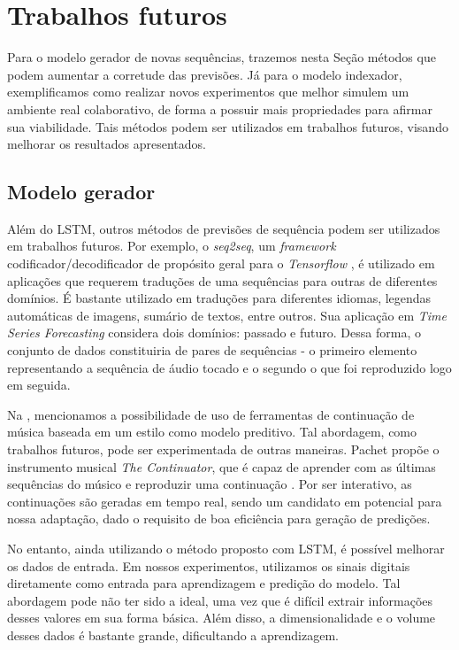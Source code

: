 \section{Trabalhos futuros}
\label{sec:later_work}

Para o modelo gerador de novas sequências, trazemos nesta Seção métodos que podem aumentar a corretude das previsões. Já para o modelo indexador, exemplificamos como realizar novos experimentos que melhor simulem um ambiente real colaborativo, de forma a possuir mais propriedades para afirmar sua viabilidade. Tais métodos podem ser utilizados em trabalhos futuros, visando melhorar os resultados apresentados.

\subsection{Modelo gerador}

Além do LSTM, outros métodos de previsões de sequência podem ser utilizados em trabalhos futuros. Por exemplo, o \textit{seq2seq}, um \textit{framework} codificador/decodificador de propósito geral para o \textit{Tensorflow} \cite{seq2seq}, é utilizado em aplicações que requerem traduções de uma sequências para outras de diferentes domínios. É bastante utilizado em traduções para diferentes idiomas, legendas automáticas de imagens, sumário de textos, entre outros. Sua aplicação em \textit{Time Series Forecasting} considera dois domínios: passado e futuro. Dessa forma, o conjunto de dados constituiria de pares de sequências - o primeiro elemento representando a sequência de áudio tocado e o segundo o que foi reproduzido logo em seguida.

Na , mencionamos a possibilidade de uso de ferramentas de continuação de música baseada em um estilo como modelo preditivo. Tal abordagem, como trabalhos futuros, pode ser experimentada de outras maneiras. Pachet propõe o instrumento musical \textit{The Continuator}, que é capaz de aprender com as últimas sequências do músico e reproduzir uma continuação \cite{continuator}. Por ser interativo, as continuações são geradas em tempo real, sendo um candidato em potencial para nossa adaptação, dado o requisito de boa eficiência para geração de predições.

No entanto, ainda utilizando o método proposto com LSTM, é possível melhorar os dados de entrada. Em nossos experimentos, utilizamos os sinais digitais diretamente como entrada para aprendizagem e predição do modelo. Tal abordagem pode não ter sido a ideal, uma vez que é difícil extrair informações desses valores em sua forma básica. Além disso, a dimensionalidade e o volume desses dados é bastante grande, dificultando a aprendizagem.

